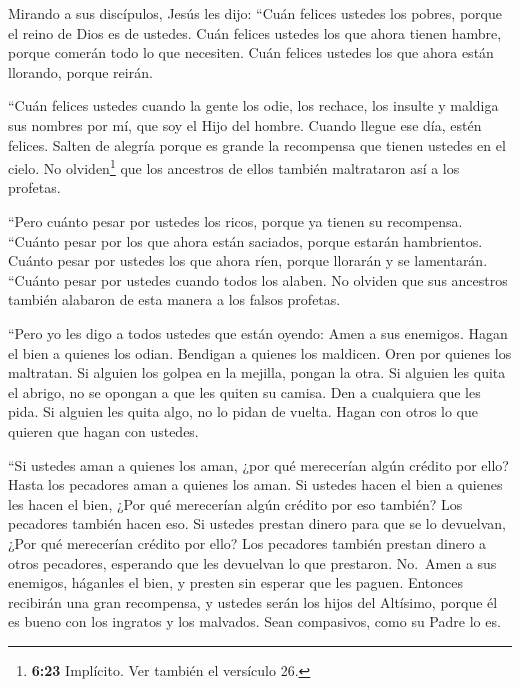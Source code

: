  Mirando a sus discípulos, Jesús les dijo: 
``Cuán felices ustedes los pobres, porque el reino de Dios es de
ustedes. Cuán felices ustedes los que ahora tienen hambre, porque
comerán todo lo que necesiten. Cuán felices ustedes los que ahora están
llorando, porque reirán.

 ``Cuán felices ustedes cuando la gente los odie, los
rechace, los insulte y maldiga sus nombres por mí, que soy el Hijo del
hombre.  Cuando llegue ese día, estén felices. Salten de
alegría porque es grande la recompensa que tienen ustedes en el cielo.
No olviden\footnote{\textbf{6:23} Implícito. Ver también el versículo
  26.} que los ancestros de ellos también maltrataron así a los
profetas.

 ``Pero cuánto pesar por ustedes los ricos, porque ya
tienen su recompensa.  ``Cuánto pesar por los que ahora
están saciados, porque estarán hambrientos. Cuánto pesar por ustedes los
que ahora ríen, porque llorarán y se lamentarán.  ``Cuánto
pesar por ustedes cuando todos los alaben. No olviden que sus ancestros
también alabaron de esta manera a los falsos profetas.

 ``Pero yo les digo a todos ustedes que están oyendo: Amen
a sus enemigos. Hagan el bien a quienes los odian. 
Bendigan a quienes los maldicen. Oren por quienes los maltratan.
 Si alguien los golpea en la mejilla, pongan la otra. Si
alguien les quita el abrigo, no se opongan a que les quiten su camisa.
 Den a cualquiera que les pida. Si alguien les quita algo,
no lo pidan de vuelta.  Hagan con otros lo que quieren que
hagan con ustedes.

 ``Si ustedes aman a quienes los aman, ¿por qué merecerían
algún crédito por ello? Hasta los pecadores aman a quienes los aman.
 Si ustedes hacen el bien a quienes les hacen el bien, ¿Por
qué merecerían algún crédito por eso también? Los pecadores también
hacen eso.  Si ustedes prestan dinero para que se lo
devuelvan, ¿Por qué merecerían crédito por ello? Los pecadores también
prestan dinero a otros pecadores, esperando que les devuelvan lo que
prestaron.  No.~Amen a sus enemigos, háganles el bien, y
presten sin esperar que les paguen. Entonces recibirán una gran
recompensa, y ustedes serán los hijos del Altísimo, porque él es bueno
con los ingratos y los malvados.  Sean compasivos, como su
Padre lo es.

